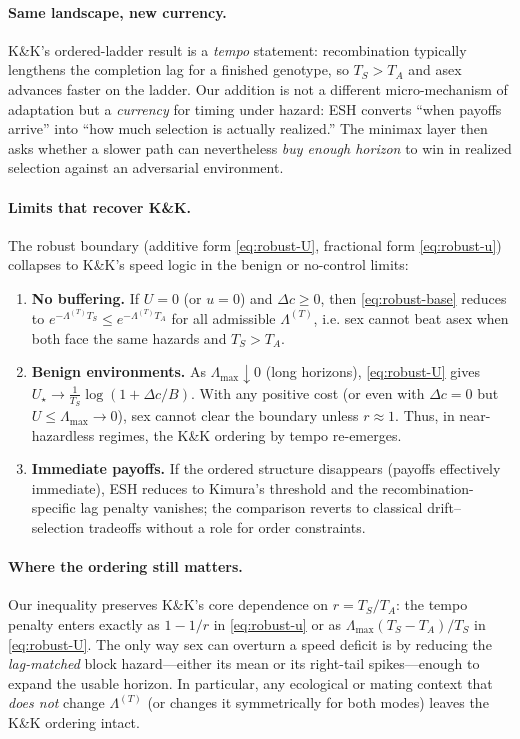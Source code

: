\documentclass[11pt]{article}
\theoremstyle{upright}
\newcommand{\horizon}{\Lambda}
\newcommand{\Lmax}{\horizon^{(T)}_{\max}}
\newcommand{\hazT}[1]{\Lambda^{(#1)}}          %
\renewcommand{\Lmax}{\Lambda_{\max}}
\begin{document}
\paragraph{Same landscape, new currency.}
K\&K’s ordered-ladder result is a \emph{tempo} statement: recombination typically lengthens the completion lag for a finished genotype, so $T_S>T_A$ and asex advances faster on the ladder. Our addition is not a different micro-mechanism of adaptation but a \emph{currency} for timing under hazard: ESH converts “when payoffs arrive” into “how much selection is actually realized.” The minimax layer then asks whether a slower path can nevertheless \emph{buy enough horizon} to win in realized selection against an adversarial environment.

\paragraph{Limits that recover K\&K.}
The robust boundary (additive form \eqref{eq:robust-U}, fractional form \eqref{eq:robust-u}) collapses to K\&K’s speed logic in the benign or no-control limits:
\begin{enumerate}[label=(L\arabic*)]
\item \textbf{No buffering.} If $U=0$ (or $u=0$) and $\Delta c\ge 0$, then \eqref{eq:robust-base} reduces to $e^{-\hazT{T}T_S}\le e^{-\hazT{T}T_A}$ for all admissible $\hazT{T}$, i.e. sex cannot beat asex when both face the same hazards and $T_S>T_A$.
\item \textbf{Benign environments.} As $\Lmax\downarrow 0$ (long horizons), \eqref{eq:robust-U} gives $U_\star\to \frac{1}{T_S}\log(1+\Delta c/B)$. With any positive cost (or even with $\Delta c=0$ but $U\le \Lmax\to 0$), sex cannot clear the boundary unless $r\approx 1$. Thus, in near-hazardless regimes, the K\&K ordering by tempo re-emerges.
\item \textbf{Immediate payoffs.} If the ordered structure disappears (payoffs effectively immediate), ESH reduces to Kimura’s threshold and the recombination-specific lag penalty vanishes; the comparison reverts to classical drift–selection tradeoffs without a role for order constraints.
\end{enumerate}

\paragraph{Where the ordering still matters.}
Our inequality preserves K\&K’s core dependence on $r=T_S/T_A$: the tempo penalty enters exactly as $1-1/r$ in \eqref{eq:robust-u} or as $\Lmax(T_S-T_A)/T_S$ in \eqref{eq:robust-U}. The only way sex can overturn a speed deficit is by reducing the \emph{lag-matched} block hazard—either its mean or its right-tail spikes—enough to expand the usable horizon. In particular, any ecological or mating context that \emph{does not} change $\hazT{T}$ (or changes it symmetrically for both modes) leaves the K\&K ordering intact.
\end{document}
